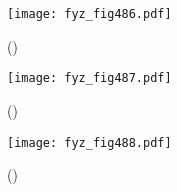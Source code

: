     \begin{figure}[ht!] %
      \centering
      \texttt{[image: fyz\_fig486.pdf]}
      \caption{ 
               (\cite[s.~707]{Feynman01})}
      \label{fyz:fig486}
    \end{figure}

    \begin{figure}[ht!] %
      \centering
      \texttt{[image: fyz\_fig487.pdf]}
      \caption{ 
               (\cite[s.~707]{Feynman01})}
      \label{fyz:fig487}
    \end{figure}

    \begin{figure}[ht!] %
      \centering
      \texttt{[image: fyz\_fig488.pdf]}
      \caption{ 
               (\cite[s.~707]{Feynman01})}
      \label{fyz:fig488}
    \end{figure}
    
